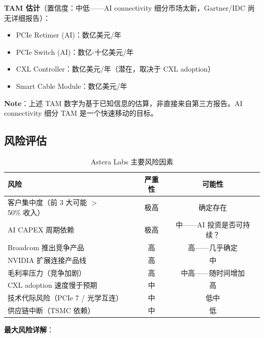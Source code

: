 \textbf{TAM 估计}（置信度：中低——AI connectivity 细分市场太新，Gartner/IDC 尚无详细报告）：
\begin{itemize}
    \item PCIe Retimer (AI)：数亿美元/年
    \item PCIe Switch (AI)：数亿-十亿美元/年
    \item CXL Controller：数亿美元/年（潜在，取决于 CXL adoption）
    \item Smart Cable Module：数亿美元/年
\end{itemize}

\begin{warningblock}
{\color{darkred}\textbf{Note}}：上述 TAM 数字为基于已知信息的估算，非直接来自第三方报告。AI connectivity 细分 TAM 是一个快速移动的目标。
\end{warningblock}

\subsection{风险评估}

\begin{table}[htb]
    \centering
    \caption{Astera Labs 主要风险因素}
    \label{tab:risks}
    \begin{tabular}{lcc}
        \toprule
        \textbf{风险} & \textbf{严重性} & \textbf{可能性} \\
        \midrule
        \rowcolor{red!10}
        客户集中度（前 3 大可能 $>$50\% 收入）& 极高 & 确定存在 \\
        \rowcolor{red!10}
        AI CAPEX 周期依赖 & 极高 & 中——AI 投资是否可持续？ \\
        \rowcolor{orange!10}
        Broadcom 推出竞争产品 & 高 & 高——几乎确定 \\
        \rowcolor{orange!10}
        NVIDIA 扩展连接产品线 & 高 & 中 \\
        \rowcolor{orange!10}
        毛利率压力（竞争加剧）& 高 & 中高——随时间增加 \\
        \rowcolor{orange!5}
        CXL adoption 速度慢于预期 & 中 & 高 \\
        \rowcolor{yellow!10}
        技术代际风险（PCIe 7 / 光学互连）& 中 & 低中 \\
        \rowcolor{yellow!10}
        供应链中断（TSMC 依赖）& 中 & 低 \\
        \bottomrule
    \end{tabular}
\end{table}

\textbf{最大风险详解}：


